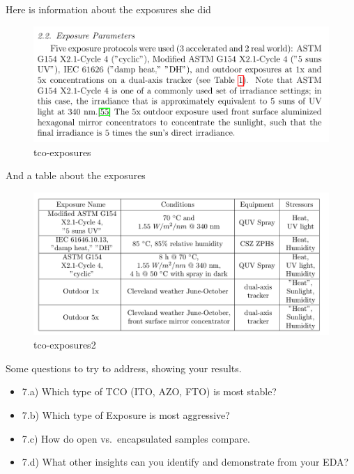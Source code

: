 \documentclass[
]{article}
\newenvironment{Shaded}{\begin{snugshade}}{\end{snugshade}}
\newcommand{\FunctionTok}[1]{\textcolor[rgb]{0.00,0.00,0.00}{#1}}
\newcommand{\NormalTok}[1]{#1}
\newcommand{\OtherTok}[1]{\textcolor[rgb]{0.56,0.35,0.01}{#1}}
\newcommand{\SpecialCharTok}[1]{\textcolor[rgb]{0.00,0.00,0.00}{#1}}
\newcommand{\StringTok}[1]{\textcolor[rgb]{0.31,0.60,0.02}{#1}}
\providecommand{\tightlist}{%
  \setlength{\itemsep}{0pt}\setlength{\parskip}{0pt}}
\begin{document}
Here is information about the exposures she did

\begin{figure}
\centering
\includegraphics{./figs/tco-exposures.png}
\caption{tco-exposures}
\end{figure}

And a table about the exposures

\begin{figure}
\centering
\includegraphics{./figs/tco-exposures2.png}
\caption{tco-exposures2}
\end{figure}

Some questions to try to address, showing your results.

\begin{itemize}
\tightlist
\item
  7.a) Which type of TCO (ITO, AZO, FTO) is most stable?
\item
  7.b) Which type of Exposure is most aggressive?
\item
  7.c) How do open vs.~encapsulated samples compare.
\item
  7.d) What other insights can you identify and demonstrate from your
  EDA?
\end{itemize}

\begin{Shaded}
\end{Shaded}
\end{document}
